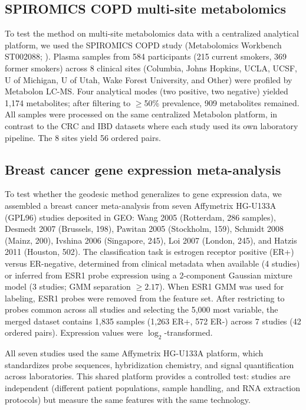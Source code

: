 \documentclass[11pt]{article}
\begin{document}
\subsection{SPIROMICS COPD multi-site metabolomics}
\label{sec:copd_data}

To test the method on multi-site metabolomics data with a centralized analytical platform, we used the SPIROMICS COPD study (Metabolomics Workbench ST002088; \citealp{bowler2017spiromics}). Plasma samples from 584 participants (215 current smokers, 369 former smokers) across 8 clinical sites (Columbia, Johns Hopkins, UCLA, UCSF, U of Michigan, U of Utah, Wake Forest University, and Other) were profiled by Metabolon LC-MS. Four analytical modes (two positive, two negative) yielded 1{,}174 metabolites; after filtering to $\geq$50\% prevalence, 909 metabolites remained. All samples were processed on the same centralized Metabolon platform, in contrast to the CRC and IBD datasets where each study used its own laboratory pipeline. The 8 sites yield 56 ordered pairs.

\subsection{Breast cancer gene expression meta-analysis}
\label{sec:brca_geo_data}

To test whether the geodesic method generalizes to gene expression data, we assembled a breast cancer meta-analysis from seven Affymetrix HG-U133A (GPL96) studies deposited in GEO: Wang 2005 (Rotterdam, 286 samples), Desmedt 2007 (Brussels, 198), Pawitan 2005 (Stockholm, 159), Schmidt 2008 (Mainz, 200), Ivshina 2006 (Singapore, 245), Loi 2007 (London, 245), and Hatzis 2011 (Houston, 502). The classification task is estrogen receptor positive (ER+) versus ER-negative, determined from clinical metadata when available (4 studies) or inferred from ESR1 probe expression using a 2-component Gaussian mixture model (3 studies; GMM separation $\geq 2.17$). When ESR1 GMM was used for labeling, ESR1 probes were removed from the feature set. After restricting to probes common across all studies and selecting the 5{,}000 most variable, the merged dataset contains 1{,}835 samples (1{,}263 ER+, 572 ER-) across 7 studies (42 ordered pairs). Expression values were $\log_2$-transformed.

All seven studies used the same Affymetrix HG-U133A platform, which standardizes probe sequences, hybridization chemistry, and signal quantification across laboratories. This shared platform provides a controlled test: studies are independent (different patient populations, sample handling, and RNA extraction protocols) but measure the same features with the same technology.
\end{document}
